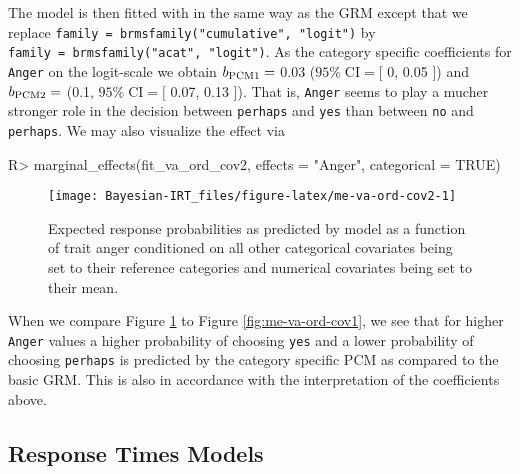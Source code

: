 \documentclass[jss]{jss}
\begin{document}
The model is then fitted with  in the same way as the GRM
except that we replace
\texttt{family\ =\ brmsfamily("cumulative",\ "logit")} by
\texttt{family\ =\ brmsfamily("acat",\ "logit")}. As the category
specific coefficients for \texttt{Anger} on the logit-scale we obtain
\(b_{\rm PCM 1} =\) 0.03 (\(95\% \; \text{CI} = [\) 0, 0.05 \(]\)) and
\(b_{\rm PCM 2} =\) (0.1, \(95\% \; \text{CI} = [\) 0.07, 0.13 \(]\)).
That is, \texttt{Anger} seems to play a mucher stronger role in the
decision between \texttt{perhaps} and \texttt{yes} than between
\texttt{no} and \texttt{perhaps}. We may also visualize the effect via

\begin{CodeChunk}

\begin{CodeInput}
R> marginal_effects(fit_va_ord_cov2, effects = "Anger", categorical = TRUE)
\end{CodeInput}
\begin{figure}

{\centering \texttt{[image: Bayesian-IRT\_files/figure-latex/me-va-ord-cov2-1]} 

}

\caption[Expected response probabilities as predicted by model  as a function of trait anger conditioned on all other categorical covariates being set to their reference categories and numerical covariates being set to their mean]{Expected response probabilities as predicted by model  as a function of trait anger conditioned on all other categorical covariates being set to their reference categories and numerical covariates being set to their mean.}\label{fig:me-va-ord-cov2}
\end{figure}
\end{CodeChunk}

When we compare Figure \ref{fig:me-va-ord-cov2} to Figure
\ref{fig:me-va-ord-cov1}, we see that for higher \texttt{Anger} values a
higher probability of choosing \texttt{yes} and a lower probability of
choosing \texttt{perhaps} is predicted by the category specific PCM as
compared to the basic GRM. This is also in accordance with the
interpretation of the coefficients above.

\hypertarget{response-times}{%
\subsection{Response Times Models}\label{response-times}}
\end{document}

